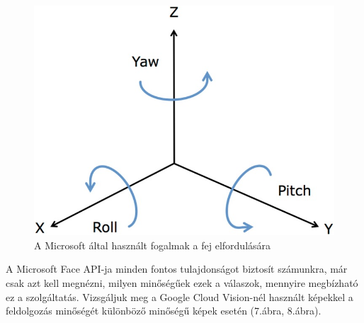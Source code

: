 \begin{figure}[h]
\centering
  \includegraphics[scale=2]{img/roll_yaw_pitch}
    \caption{A Microsoft által használt fogalmak a fej elfordulására \cite{roll_yaw_pitch}}
\end{figure}

A Microsoft Face API-ja minden fontos tulajdonságot biztosít számunkra, már csak azt kell megnézni, milyen minőségűek ezek a válaszok, mennyire megbízható ez a szolgáltatás. Vizsgáljuk meg a Google Cloud Vision-nél használt képekkel a feldolgozás minőségét különböző minőségű képek esetén  (7.ábra, 8.ábra).

